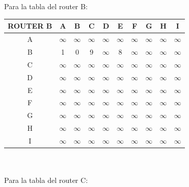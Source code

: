 \documentclass{article}
\begin{document}
\\\\
Para la tabla del router B:\\
\begin{tabular}{ | c | c | c | c | c | c | c | c | c | c |}
\hline                 
ROUTER B    & A      & B      & C      & D      & E      & F      & G      & H      & I      \\
\hline
        A   &$\infty$&$\infty$&$\infty$&$\infty$&$\infty$&$\infty$&$\infty$&$\infty$&$\infty$\\
\hline
        B   & 1      & 0      & 9      &$\infty$& 8      &$\infty$&$\infty$&$\infty$&$\infty$\\
\hline
        C   &$\infty$&$\infty$&$\infty$&$\infty$&$\infty$&$\infty$&$\infty$&$\infty$&$\infty$\\
\hline
        D   &$\infty$&$\infty$&$\infty$&$\infty$&$\infty$&$\infty$&$\infty$&$\infty$&$\infty$\\
\hline
        E   &$\infty$&$\infty$&$\infty$&$\infty$&$\infty$&$\infty$&$\infty$&$\infty$&$\infty$\\
\hline
        F   &$\infty$&$\infty$&$\infty$&$\infty$&$\infty$&$\infty$&$\infty$&$\infty$&$\infty$\\
\hline
        G   &$\infty$&$\infty$&$\infty$&$\infty$&$\infty$&$\infty$&$\infty$&$\infty$&$\infty$\\
\hline
        H   &$\infty$&$\infty$&$\infty$&$\infty$&$\infty$&$\infty$&$\infty$&$\infty$&$\infty$\\
\hline 
        I   &$\infty$&$\infty$&$\infty$&$\infty$&$\infty$&$\infty$&$\infty$&$\infty$&$\infty$\\
\hline
\end{tabular}
\\\\
Para la tabla del router C:\\
\end{document}
